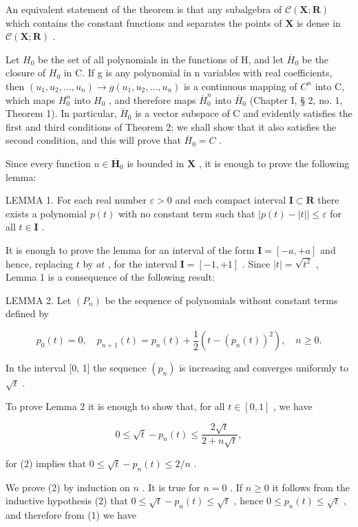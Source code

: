 An equivalent statement of the theorem is that any subalgebra of \(\mathcal{C}(\mathbf{X};\mathbf{R})\) which contains the constant functions and separates the points of \(\mathbf{X}\) is dense in \(\mathcal{C}(\mathbf{X};\mathbf{R})\) .

Let \(H_{0}\) be the set of all polynomials in the functions of H, and let \(\overline{H}_{0}\) be the closure of \(H_{0}\) in C. If g is any polynomial in n variables with real coefficients, then \((u_{1}, u_{2}, \ldots, u_{n}) \to g(u_{1}, u_{2}, \ldots, u_{n})\) is a continuous mapping of \(C^{n}\) into C, which maps \(H_{0}^{n}\) into \(H_{0}\) , and therefore maps \(\overline{H}_{0}^{n}\) into \(\overline{H}_{0}\) (Chapter I, § 2, no. 1, Theorem 1). In particular, \(\overline{H}_{0}\) is a vector subspace of C and evidently satisfies the first and third conditions of Theorem 2; we shall show that it also satisfies the second condition, and this will prove that \(\overline{H}_{0} = C\) .

Since every function \(u \in \overline{\mathbf{H}}_0\) is bounded in \(\mathbf{X}\) , it is enough to prove the following lemma:

LEMMA 1. For each real number \(\varepsilon > 0\) and each compact interval \(\mathbf{I} \subset \mathbf{R}\) there exists a polynomial \(p(t)\) with no constant term such that \(|p(t) - |t|| \leqslant \varepsilon\) for all \(t \in \mathbf{I}\) .

It is enough to prove the lemma for an interval of the form \(\mathbf{I} = [-a, +a]\) and hence, replacing \(t\) by \(at\) , for the interval \(\mathbf{I} = [-1, +1]\) . Since \(|t| = \sqrt{t^2}\) , Lemma 1 is a consequence of the following result:

LEMMA 2. Let \((P_n)\) be the sequence of polynomials without constant terms defined by

\[
p _ {0} (t) = 0, \quad p _ {n + 1} (t) = p _ {n} (t) + \frac {1}{2} (t - (p _ {n} (t)) ^ {2}), \quad n \geqslant 0.\tag{1}
\]

In the interval {[}0, 1{]} the sequence \((p_n)\) is increasing and converges uniformly to \(\sqrt{t}\) .

To prove Lemma 2 it is enough to show that, for all \(t \in [0, 1]\) , we have

\[
0 \leqslant \sqrt {t} - p _ {n} (t) \leqslant \frac {2 \sqrt {t}}{2 + n \sqrt {t}},\tag{2}
\]

for (2) implies that \(0 \leqslant \sqrt{t} - p_n(t) \leqslant 2 / n\) .

We prove (2) by induction on \(n\) . It is true for \(n = 0\) . If \(n \geqslant 0\) it follows from the inductive hypothesis (2) that \(0 \leqslant \sqrt{t} - p_n(t) \leqslant \sqrt{t}\) , hence \(0 \leqslant p_n(t) \leqslant \sqrt{t}\) , and therefore from (1) we have

